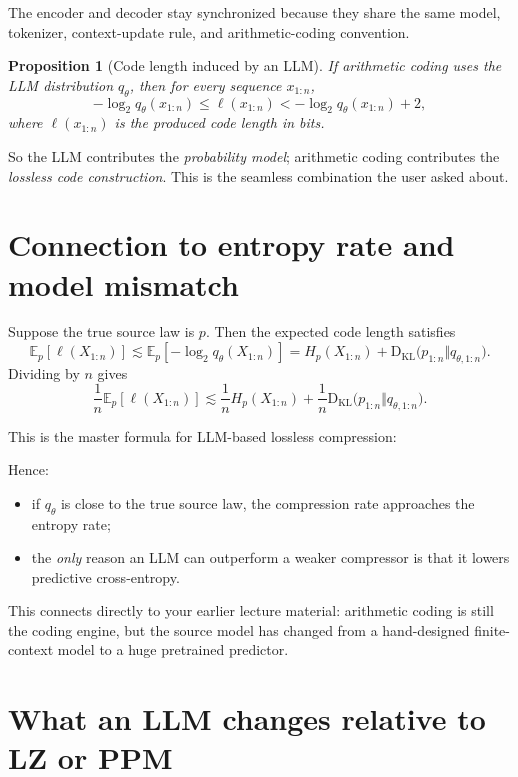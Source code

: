 \documentclass[11pt]{article}
\newtheorem{proposition}{Proposition}
\theoremstyle{remark}
\newcommand{\E}{\mathbb{E}}
\newcommand{\KL}{\mathrm{D_{KL}}}
\begin{document}
The encoder and decoder stay synchronized because they share the same model, tokenizer, context-update rule, and arithmetic-coding convention.

\begin{proposition}[Code length induced by an LLM]
If arithmetic coding uses the LLM distribution $q_\theta$, then for every sequence $x_{1:n}$,
\[
-\log_2 q_\theta(x_{1:n}) \le \ell(x_{1:n}) < -\log_2 q_\theta(x_{1:n}) + 2,
\]
where $\ell(x_{1:n})$ is the produced code length in bits.
\end{proposition}

So the LLM contributes the \emph{probability model}; arithmetic coding contributes the \emph{lossless code construction}. This is the seamless combination the user asked about.

\section{Connection to entropy rate and model mismatch}

Suppose the true source law is $p$. Then the expected code length satisfies
\[
\E_p[\ell(X_{1:n})] \lesssim \E_p[-\log_2 q_\theta(X_{1:n})]
= H_p(X_{1:n}) + \KL\!\bigl(p_{1:n}\Vert q_{\theta,1:n}\bigr).
\]
Dividing by $n$ gives
\[
\frac{1}{n}\E_p[\ell(X_{1:n})]
\lesssim
\frac{1}{n}H_p(X_{1:n})
+
\frac{1}{n}\KL\!\bigl(p_{1:n}\Vert q_{\theta,1:n}\bigr).
\]

This is the master formula for LLM-based lossless compression:
\begin{center}
\end{center}

Hence:
\begin{itemize}
    \item if $q_\theta$ is close to the true source law, the compression rate approaches the entropy rate;
    \item the \emph{only} reason an LLM can outperform a weaker compressor is that it lowers predictive cross-entropy.
\end{itemize}

This connects directly to your earlier lecture material: arithmetic coding is still the coding engine, but the source model has changed from a hand-designed finite-context model to a huge pretrained predictor.

\section{What an LLM changes relative to LZ or PPM}
\end{document}
